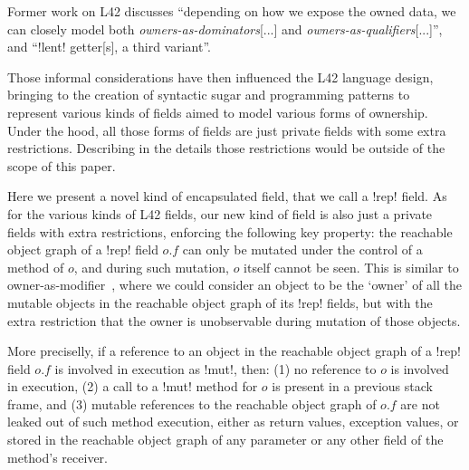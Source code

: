 

Former work on L42 discusses ``depending on how we expose the owned data, we can closely model both \emph{owners-as-dominators}[...] and \emph{owners-as-qualifiers}[...]''\cite{GIANNINI2019145}, and  ``\Q!lent! getter[s], a third variant''\cite{GIANNINI2019145}.%

Those informal considerations have then influenced the L42 language design,
bringing to the creation of syntactic sugar and programming patterns to represent various kinds of \Q@capsule@ fields aimed to model various forms of ownership. Under the hood, all those forms of \Q@capsule@ fields are just private \Q@mut@ fields with some extra restrictions. Describing in the details those restrictions would be outside of the scope of this paper.

Here we present a novel kind of encapsulated field, that we call a  \Q!rep! field.
As for the various kinds of L42 \Q@capsule@ fields, our new kind of field is also just 
a private \Q@mut@ fields with extra restrictions,
enforcing the following key property:
the reachable object graph of a \Q!rep! field $o.f$ can only be mutated under the control of a \Q@mut@ method of $o$, and during such mutation, $o$ itself cannot be seen.
This is similar to owner-as-modifier~\cite{Dietl05universes:lightweight,10.1007/978-3-540-92188-2_4}, 
where we could consider an object to be the `owner' of all the mutable objects in the reachable object graph of its \Q!rep! fields, but with the extra restriction that the owner is unobservable during mutation of those objects.

More preciselly, if a reference to an object in the reachable object graph of a \Q!rep! field $o.f$ is involved in execution as \Q!mut!, then:
(1) no reference to $o$ is involved in execution,
(2) a call to a \Q!mut! method for $o$ is present in a previous stack frame, and
(3) mutable references to the reachable object graph of $o.f$ are not leaked out of such method execution, either as return values, exception values, or stored in the reachable object graph of any parameter or any other field of the method's receiver.


